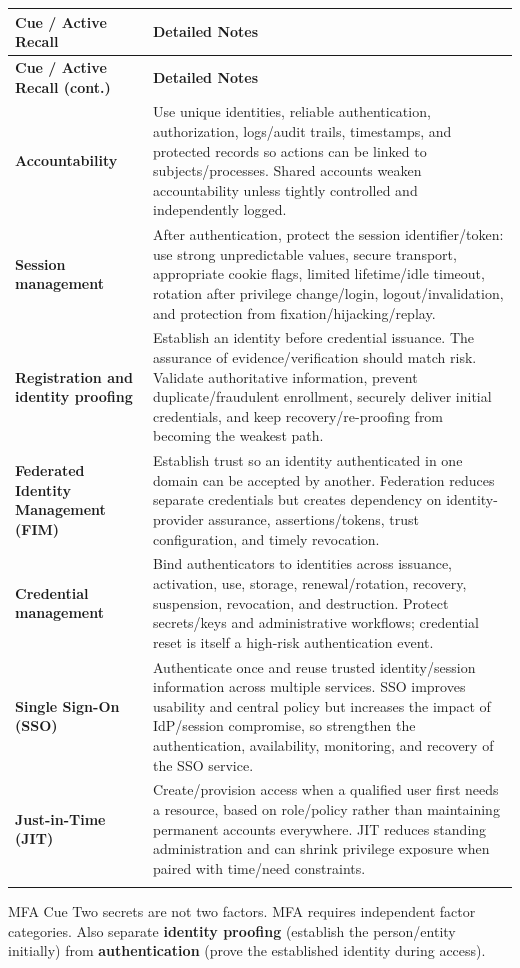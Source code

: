 \documentclass[10pt,letterpaper]{article}
\makeatletter
\newenvironment{cornell}{\rowcolors{2}{white}{notebg}\begin{longtable}{@{}>{\raggedright\arraybackslash\columncolor{cuebg}\color{navy}\bfseries}p{0.285\textwidth}>{\raggedright\arraybackslash}p{0.65\textwidth}@{}}\rowcolor{navy}\color{white}\textbf{Cue / Active Recall} & \color{white}\textbf{Detailed Notes}\\ \hline\endfirsthead\rowcolor{navy}\color{white}\textbf{Cue / Active Recall (cont.)} & \color{white}\textbf{Detailed Notes}\\ \hline\endhead}{\end{longtable}}
\newcommand{\noterow}[2]{#1 & #2\\\arrayrulecolor{line}\hline}\newcommand{\source}[1]{\par{\footnotesize\color{teal}\textit{Source: CBK, #1}}\par}
\makeatother
\begin{document}
\begin{cornell}
\noterow{Accountability}{Use unique identities, reliable authentication, authorization, logs/audit trails, timestamps, and protected records so actions can be linked to subjects/processes. Shared accounts weaken accountability unless tightly controlled and independently logged.}
\noterow{Session management}{After authentication, protect the session identifier/token: use strong unpredictable values, secure transport, appropriate cookie flags, limited lifetime/idle timeout, rotation after privilege change/login, logout/invalidation, and protection from fixation/hijacking/replay.}
\noterow{Registration and identity proofing}{Establish an identity before credential issuance. The assurance of evidence/verification should match risk. Validate authoritative information, prevent duplicate/fraudulent enrollment, securely deliver initial credentials, and keep recovery/re-proofing from becoming the weakest path.}
\noterow{Federated Identity Management (FIM)}{Establish trust so an identity authenticated in one domain can be accepted by another. Federation reduces separate credentials but creates dependency on identity-provider assurance, assertions/tokens, trust configuration, and timely revocation.}
\noterow{Credential management}{Bind authenticators to identities across issuance, activation, use, storage, renewal/rotation, recovery, suspension, revocation, and destruction. Protect secrets/keys and administrative workflows; credential reset is itself a high-risk authentication event.}
\noterow{Single Sign-On (SSO)}{Authenticate once and reuse trusted identity/session information across multiple services. SSO improves usability and central policy but increases the impact of IdP/session compromise, so strengthen the authentication, availability, monitoring, and recovery of the SSO service.}
\noterow{Just-in-Time (JIT)}{Create/provision access when a qualified user first needs a resource, based on role/policy rather than maintaining permanent accounts everywhere. JIT reduces standing administration and can shrink privilege exposure when paired with time/need constraints.}
\end{cornell}

\begin{exambox}{MFA Cue}
Two secrets are not two factors. MFA requires independent factor categories. Also separate \textbf{identity proofing} (establish the person/entity initially) from \textbf{authentication} (prove the established identity during access).
\end{exambox}
\end{document}
